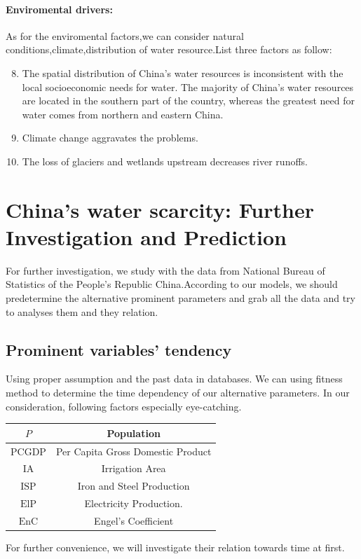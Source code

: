 \paragraph{Enviromental drivers:}As for the enviromental factors,we can consider natural conditions,climate,distribution of water resource.List three factors as follow:

\begin{enumerate}
\setcounter{enumi}{7}
\item The spatial distribution of China’s water resources is inconsistent with the local socioeconomic needs for water. The majority of China’s water resources are located in the southern part of the country, whereas the greatest need for water comes from northern and eastern China.
\item Climate change aggravates the problems.
\item The loss of glaciers and wetlands upstream decreases river runoffs.
\end{enumerate}


\section{China's water scarcity: Further Investigation and Prediction}

  For further investigation, we study with the data from National Bureau of Statistics of the People's Republic China\cite{ChinaDataBase}.According to our models, we should predetermine the alternative prominent parameters and grab all the data and try to analyses them and they relation.
  \subsection{Prominent variables' tendency}
  Using proper assumption and the past data in databases. We can using fitness method to determine the time dependency of our alternative parameters.
  In our consideration, following factors especially eye-catching.
  \begin{table}[!h]
  \centering
  \begin{tabular}{|c|c|}
  \hline
  $P$ & Population \\
  \hline
  $\text{PCGDP}$ & Per Capita Gross Domestic Product \\
  \hline
  $\text{IA}$ & Irrigation Area \\
  \hline
  $\text{ISP}$ & Iron and Steel Production \\
  \hline
  $\text{ElP}$ & Electricity Production. \\
  \hline
  $\text{EnC}$ & Engel's Coefficient \\
  \hline
  \end{tabular}
  \end{table}
  For further convenience, we will investigate their relation towards time at first.
